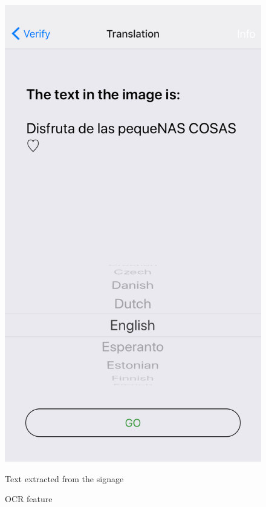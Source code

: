 \documentclass[12pt]{article}
\begin{document}
\begin{figure} [H]
\begin{minipage}{.5\textwidth}
  \includegraphics[width=0.9\linewidth]{media/case3.PNG}
  \caption{OCR feature}{Text extracted from the signage}
  \label{fig:case3}
\end{minipage}
\end{figure}
\end{document}
